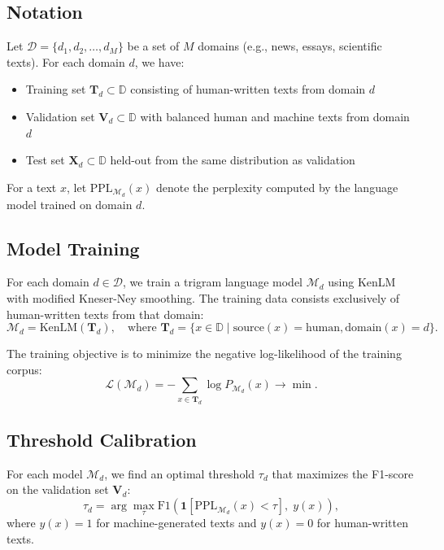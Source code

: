\documentclass{article}
\begin{document}
\subsection{Notation}

Let $\mathcal{D} = \{d_1, d_2, \dots, d_M\}$ be a set of $M$ domains (e.g., news, essays, scientific texts). For each domain $d$, we have:
\begin{itemize}
    \item Training set $\mathbf{T}_d \subset \mathbb{D}$ consisting of human-written texts from domain $d$
    \item Validation set $\mathbf{V}_d \subset \mathbb{D}$ with balanced human and machine texts from domain $d$
    \item Test set $\mathbf{X}_d \subset \mathbb{D}$ held-out from the same distribution as validation
\end{itemize}

For a text $x$, let $\text{PPL}_{\mathcal{M}_d}(x)$ denote the perplexity computed by the language model trained on domain $d$.

\subsection{Model Training}

For each domain $d \in \mathcal{D}$, we train a trigram language model $\mathcal{M}_d$ using KenLM with modified Kneser-Ney smoothing. The training data consists exclusively of human-written texts from that domain:
\[
\mathcal{M}_d = \text{KenLM}(\mathbf{T}_d), \quad \text{where } \mathbf{T}_d = \{x \in \mathbb{D} \mid \text{source}(x) = \text{human}, \text{domain}(x) = d\}.
\]

The training objective is to minimize the negative log-likelihood of the training corpus:
\[
\mathcal{L}(\mathcal{M}_d) = -\sum_{x \in \mathbf{T}_d} \log P_{\mathcal{M}_d}(x) \rightarrow \min.
\]

\subsection{Threshold Calibration}

For each model $\mathcal{M}_d$, we find an optimal threshold $\tau_d$ that maximizes the F1-score on the validation set $\mathbf{V}_d$:
\[
\tau_d = \arg\max_{\tau} \text{F1}\left( \mathbf{1}[\text{PPL}_{\mathcal{M}_d}(x) < \tau],\; y(x) \right),
\]
where $y(x) = 1$ for machine-generated texts and $y(x) = 0$ for human-written texts.
\end{document}
